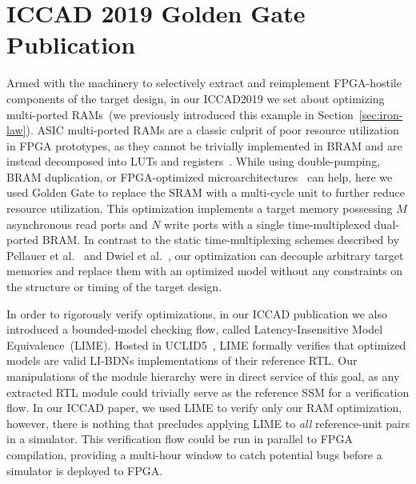 \section{ICCAD 2019 Golden Gate Publication}

Armed with the machinery to selectively extract and reimplement FPGA-hostile
components of the target design, in our ICCAD2019 we set about optimizing
multi-ported RAMs~(we previously introduced this example in
Section~\ref{sec:iron-law}).  ASIC multi-ported RAMs are a classic culprit of
poor resource utilization in FPGA prototypes, as they cannot be trivially
implemented in BRAM and are instead decomposed into LUTs and
registers~\cite{FPGAGap2}.  While using double-pumping, BRAM duplication, or
FPGA-optimized microarchitectures~\cite{MultiportXOR} can help, here we used Golden Gate to
replace the SRAM with a multi-cycle unit to further reduce resource
utilization. This optimization implements a target memory possessing $M$ asynchronous read ports and
$N$ write ports with a single time-multiplexed dual-ported BRAM. In contrast to the static time-multiplexing schemes described
by Pellauer et al.~\cite{APortNetworks} and Dwiel et al.~\cite{fabscalarfpga}, our optimization can decouple arbitrary target
memories and replace them with an optimized model without any constraints on the structure or timing of the
target design.

In order to rigorously verify optimizations, in our ICCAD publication we also
introduced a bounded-model checking flow, called Latency-Insensitive Model
Equivalence~(LIME). Hosted in UCLID5~\cite{UCLID5}, LIME formally verifies that
optimized models are valid LI-BDNs implementations of their reference RTL.  Our
manipulations of the module hierarchy were in direct service of this goal, as
any extracted RTL module could trivially serve as the reference SSM for a
verification flow. In our ICCAD paper, we used LIME to verify only our RAM
optimization, however, there is nothing that precludes applying LIME to
\emph{all} reference-unit pairs in a simulator. This verification flow could be
run in parallel to FPGA compilation, providing a multi-hour window to catch
potential bugs before a simulator is deployed to FPGA.

